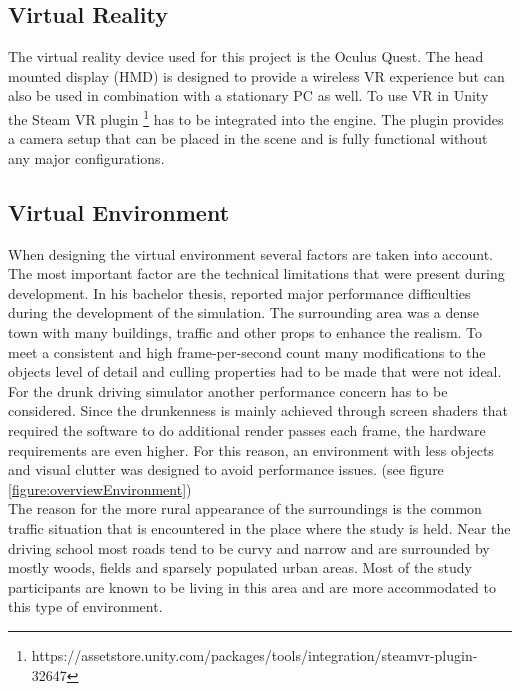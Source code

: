 \subsection{Virtual Reality}

The virtual reality device used for this project is the Oculus Quest.
The head mounted display (HMD) is designed to provide a wireless VR experience but can also be used in combination with a stationary PC as well.
To use VR in Unity the Steam VR plugin \footnote{https://assetstore.unity.com/packages/tools/integration/steamvr-plugin-32647} has to be integrated into the engine.
The plugin provides a camera setup that can be placed in the scene and is fully functional without any major configurations. 

\subsection{Virtual Environment}
\label{subsection:virtual environment}


When designing the virtual environment several factors are taken into account.
The most important factor are the technical limitations that were present during development.
In his bachelor thesis, \textcite[]{birgmann2018simulation} reported major performance difficulties during the development of the simulation.
The surrounding area was a dense town with many buildings, traffic and other props to enhance the realism.
To meet a consistent and high frame-per-second count many modifications to the objects level of detail and culling properties had to be made that were not ideal.
\\
For the drunk driving simulator another performance concern has to be considered.
Since the drunkenness is mainly achieved through screen shaders that required the software to do additional render passes each frame, the hardware requirements are even higher.
For this reason, an environment with less objects and visual clutter was designed to avoid performance issues. (see figure \ref{figure:overviewEnvironment})
\\
The reason for the more rural appearance of the surroundings is the common traffic situation that is encountered in the place where the study is held.
Near the driving school most roads tend to be curvy and narrow and are surrounded by mostly woods, fields and sparsely populated urban areas.
Most of the study participants are known to be living in this area and are more accommodated to this type of environment.



